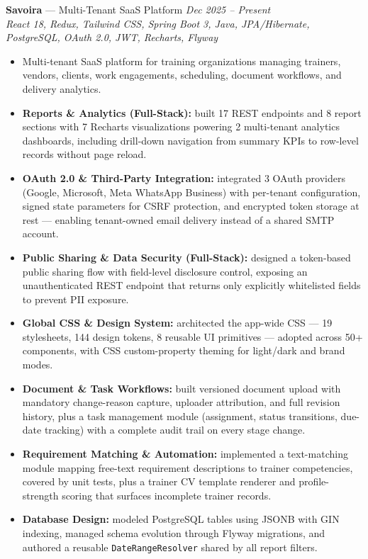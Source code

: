 \documentclass[a4paper,10pt]{article}
\begin{document}
\vspace{5pt}
\textbf{Savoira} --- Multi-Tenant SaaS Platform \hfill \textit{Dec 2025 -- Present}\\[1pt]
\textit{React 18, Redux, Tailwind CSS, Spring Boot 3, Java, JPA/Hibernate, PostgreSQL, OAuth 2.0,
JWT, Recharts, Flyway}
\begin{itemize}
  \item Multi-tenant SaaS platform for training organizations managing trainers, vendors, clients,
        work engagements, scheduling, document workflows, and delivery analytics.
  \item \textbf{Reports \& Analytics (Full-Stack):} built 17 REST endpoints and 8 report sections
        with 7 Recharts visualizations powering 2 multi-tenant analytics dashboards, including
        drill-down navigation from summary KPIs to row-level records without page reload.
  \item \textbf{OAuth 2.0 \& Third-Party Integration:} integrated 3 OAuth providers (Google,
        Microsoft, Meta WhatsApp Business) with per-tenant configuration, signed state parameters
        for CSRF protection, and encrypted token storage at rest --- enabling tenant-owned email
        delivery instead of a shared SMTP account.
  \item \textbf{Public Sharing \& Data Security (Full-Stack):} designed a token-based public
        sharing flow with field-level disclosure control, exposing an unauthenticated REST endpoint
        that returns only explicitly whitelisted fields to prevent PII exposure.
  \item \textbf{Global CSS \& Design System:} architected the app-wide CSS --- 19 stylesheets,
        144 design tokens, 8 reusable UI primitives --- adopted across 50+ components, with CSS
        custom-property theming for light/dark and brand modes.
  \item \textbf{Document \& Task Workflows:} built versioned document upload with mandatory
        change-reason capture, uploader attribution, and full revision history, plus a task
        management module (assignment, status transitions, due-date tracking) with a complete
        audit trail on every stage change.
  \item \textbf{Requirement Matching \& Automation:} implemented a text-matching module mapping
        free-text requirement descriptions to trainer competencies, covered by unit tests, plus a
        trainer CV template renderer and profile-strength scoring that surfaces incomplete
        trainer records.
  \item \textbf{Database Design:} modeled PostgreSQL tables using JSONB with GIN indexing, managed
        schema evolution through Flyway migrations, and authored a reusable
        \texttt{DateRangeResolver} shared by all report filters.
\end{itemize}
\end{document}
